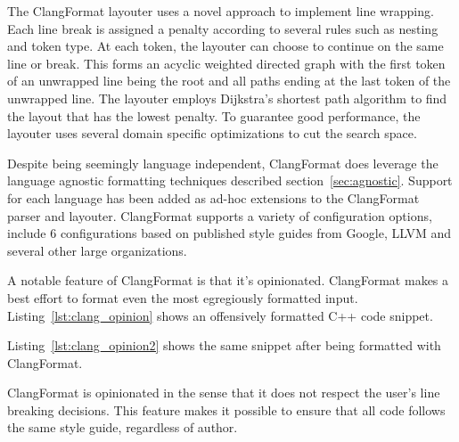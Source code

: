 The ClangFormat layouter uses a novel approach to implement line wrapping.
Each line break is assigned a penalty according to several rules such as nesting and token type.
At each token, the layouter can choose to continue on the same line or break.
This forms an acyclic weighted directed graph with the first token of an unwrapped line being the root and all paths ending at the last token of the unwrapped line.
The layouter employs Dijkstra's\autocite{dijkstra_note_1959} shortest path algorithm to find the layout that has the lowest penalty.
To guarantee good performance, the layouter uses several domain specific optimizations to cut the search space.

Despite being seemingly language independent, ClangFormat does leverage the language agnostic formatting techniques described section~\ref{sec:agnostic}.
Support for each language has been added as ad-hoc extensions to the ClangFormat parser and layouter.
ClangFormat supports a variety of configuration options, include 6 configurations based on published style guides from Google, LLVM and several other large organizations.

A notable feature of ClangFormat is that it's opinionated.
ClangFormat makes a best effort to format even the most egregiously formatted input.
Listing~\ref{lst:clang_opinion} shows an offensively formatted C++ code snippet.

Listing~\ref{lst:clang_opinion2} shows the same snippet after being formatted with ClangFormat.

ClangFormat is opinionated in the sense that it does not respect the user's line breaking decisions.
This feature makes it possible to ensure that all code follows the same style guide, regardless of author.

